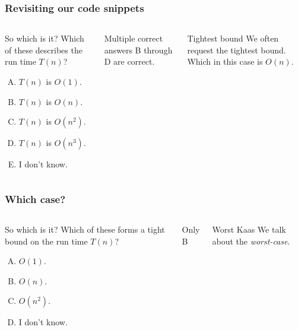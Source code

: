 \begin{frame}
	\frametitle{Revisiting our code snippets}
	
	
	\begin{columns}
	\begin{block}{So which is it?}
		Which of these describes the run time $T(n)$?
	\begin{enumerate}[A.]
		\item $T(n)$ is $O(1)$.
		\item $T(n)$ is $O(n)$. 
		\item $T(n)$ is $O(n^2)$. 
		\item $T(n)$ is $O(n^3)$. 
		\item I don't know.
	\end{enumerate}	
	\end{block}
		\pause
		\begin{block}{Multiple correct answers}
			B through D are correct.
		\end{block}
		\pause
			\begin{block}{Tightest bound}
				We often request the tightest bound. Which in this case is $O(n)$.
			\end{block}	
	\end{columns}
\end{frame}

\begin{frame}
	\frametitle{Which case?}
	
	\begin{columns}
		\column{0.755\textwidth}
	\begin{block}{So which is it?}
		Which of these forms a tight bound on the run time $T(n)$?
	\begin{enumerate}[A.]
		\small
		\item $O(1)$. 
		\item $O(n)$. 
		\item $O(n^2)$. 
		\item I don't know.
	\end{enumerate}	
	\end{block}
		\column{0.255\textwidth}
		\pause
		\begin{block}{}
			Only B
		\end{block}
		\pause
			\begin{block}{Worst Kaas}
				We talk about the \textit{worst-case}.
			\end{block}	
	\end{columns}
\end{frame}

